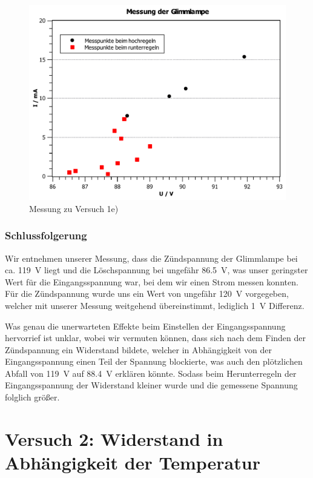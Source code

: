 \documentclass[11pt,a4paper,titlepage, ngerman]{article}
\begin{document}
				\begin{figure}
					\centering
					\includegraphics[width=\textwidth]{KennlinieGlimmlampe.pdf}
					\caption{Messung zu Versuch 1e)}
					\label{KL e}
				\end{figure}
			
			\subsubsection*{Schlussfolgerung}
			
				Wir entnehmen unserer Messung, dass die Zündspannung der Glimmlampe bei ca. \SI{119}{\V} liegt und die Löschspannung bei ungefähr \SI{86,5}{\V}, was unser geringster Wert für die Eingangsspannung war, bei dem wir einen Strom messen konnten.
				Für die Zündspannung wurde uns ein Wert von ungefähr \SI{120}{\V} vorgegeben, welcher mit unserer Messung weitgehend übereinstimmt, lediglich \SI{1}{\V} Differenz.
				
				Was genau die unerwarteten Effekte beim Einstellen der Eingangsspannung hervorrief ist unklar, wobei wir vermuten können, dass sich nach dem Finden der Zündspannung ein Widerstand bildete, welcher in Abhängigkeit von der Eingangsspannung einen Teil der Spannung blockierte, was auch den plötzlichen Abfall von \SI{119}{\V} auf \SI{88.4}{\V} erklären könnte. Sodass beim Herunterregeln der Eingangsspannung der Widerstand kleiner wurde und die gemessene Spannung folglich größer.  
			
	\section{Versuch 2: Widerstand in Abhängigkeit der Temperatur}		
		
\end{document}
